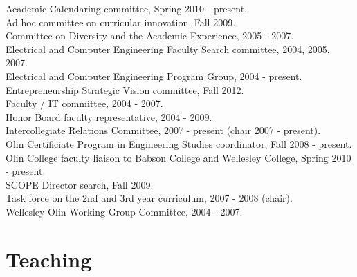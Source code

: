 \documentclass[line]{res}
\begin{document}
\begin{resume}
	Academic Calendaring committee, Spring 2010 - present.\\
	Ad hoc committee on curricular innovation, Fall 2009.\\
	Committee on Diversity and the Academic Experience, 2005 - 2007.\\
	Electrical and Computer Engineering Faculty Search committee, 2004, 2005, 2007.\\
	Electrical and Computer Engineering Program Group, 2004 - present.\\
	Entrepreneurship Strategic Vision committee, Fall 2012.\\
	Faculty / IT committee, 2004 - 2007.\\
	Honor Board faculty representative, 2004 - 2009.\\
	Intercollegiate Relations Committee, 2007 - present (chair 2007 - present).\\
	Olin Certificiate Program in Engineering Studies coordinator, Fall 2008 - present.\\
	Olin College faculty liaison to Babson College and Wellesley College, Spring 2010 - present.\\
	SCOPE Director search, Fall 2009.\\
	Task force on the 2nd and 3rd year curriculum, 2007 - 2008 (chair).\\
	Wellesley Olin Working Group Committee, 2004 - 2007.\\
	
	\section{\sc Teaching}
	

\end{resume}
\end{document}
